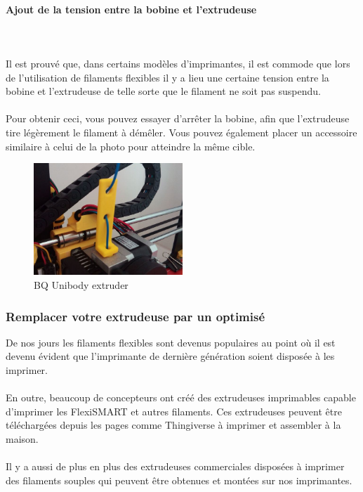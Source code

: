 \documentclass[11pt,a4paper]{article}
\begin{document}
			\paragraph{Ajout de la tension entre la bobine et l'extrudeuse}\mbox{}\\\\
Il est prouvé que, dans certains modèles d’imprimantes, il est commode que lors de l’utilisation de filaments flexibles il y a lieu une certaine tension entre la bobine et l’extrudeuse de telle sorte que le filament ne soit pas suspendu.
\\\\
Pour obtenir ceci, vous pouvez essayer d’arrêter la bobine, afin que l’extrudeuse tire légèrement le filament à démêler. Vous pouvez également placer un accessoire similaire à celui de la photo pour atteindre la même cible.
\begin{figure}[H]
\centering
\includegraphics[width=0.5\textwidth,cfbox=azul_marcos 4pt 0pt]{FOTOS/SOLUCION2}
\caption*{BQ Unibody extruder}
\end{figure}
		\subsubsection{Remplacer votre extrudeuse par un optimisé}
De nos jours les filaments flexibles sont devenus populaires au point où il est devenu évident que l’imprimante de dernière génération soient disposée à les imprimer.
\\\\
En outre, beaucoup de concepteurs ont créé des extrudeuses imprimables capable d’imprimer les FlexiSMART et autres filaments. Ces extrudeuses peuvent être téléchargées depuis les pages comme Thingiverse à imprimer et assembler à la maison.
\\\\
Il y a aussi de plus en plus des extrudeuses commerciales disposées à imprimer des filaments souples qui peuvent être obtenues et montées sur nos imprimantes.
\end{document}
